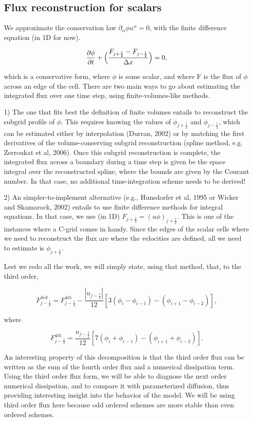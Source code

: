 \documentclass[11pt]{article}
\begin{document}
\subsection{Flux reconstruction for scalars}

We approximate the conservation law $\partial_\alpha \phi u^{\alpha} = 0$, with the finite difference equation (in 1D for now).

\begin{equation}
\pdv{\phi}{t} + \Big(\frac{F_{j+\frac{1}{2}}-F_{j-\frac{1}{2}}}{\Delta x}\Big) = 0,
\end{equation}

which is a conservative form, where $\phi$ is some scalar, and where F is the flux of $\phi$ across an edge of the cell. There are two main ways to go about estimating the integrated flux over one time step, using finite-volumes-like methods.

1) The one that fits best the definition of finite volumes entails to reconstruct the subgrid profile of $\phi$. This requires knowing the values of $\phi_{j+\frac{1}{2}}$ and $\phi_{j-\frac{1}{2}}$, which can be estimated either by interpolation (Durran, 2002) or by matching the first derivatives of the volume-conserving subgrid reconstruction (spline method, e.g. Zerroukat et al, 2006). Once this subgrid reconstruction is complete, the integrated flux across a boundary during a time step is given be the space integral over the reconstructed spline, where the bounds are given by the Courant number. In that case, no additional time-integration scheme needs to be derived!

2) An simpler-to-implement alternative (e.g., Hunsdorfer et al, 1995 or Wicker and Skamarock, 2002) entails to use finite difference methods for integral equations. In that case, we use (in 1D) $F_{j+\frac{1}{2}} = (u\phi)_{j+\frac{1}{2}}$. This is one of the instances where a C-grid comes in handy. Since the edges of the scalar cells where we need to reconstruct the flux are where the velocities are defined, all we need to estimate is $\phi_{j+\frac{1}{2}}$.

Lest we redo all the work, we will simply state, using that method, that, to the third order,

\begin{equation}
F_{j-\frac{1}{2}}^{3rd} = F_{j-\frac{1}{2}}^{4th} - \frac{|u_{j-\frac{1}{2}}|}{12}[3(\phi_i - \phi_{i-1}) - (\phi_{i+1}- \phi_{i-2})],
\end{equation}

where

\begin{equation}
F_{j-\frac{1}{2}}^{4th} = \frac{u_{j-\frac{1}{2}}}{12}[7(\phi_i + \phi_{i-1}) - (\phi_{i+1} + \phi_{i-2})].
\end{equation}

An interesting property of this decomposition is that the third order flux can be written as the sum of the fourth order flux and a numerical dissipation term. Using the third order flux form, we will be able to diagnose the next order numerical dissipation, and to compare it with parameterized diffusion, thus providing interesting insight into the behavior of the model. We will be using third order flux here because odd ordered schemes are more stable than even ordered schemes. 
\end{document}
